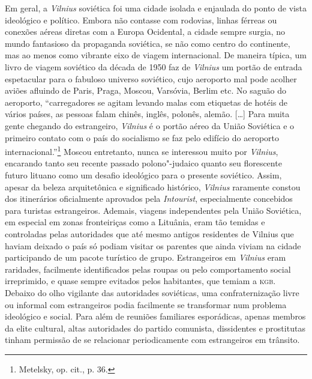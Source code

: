 Em geral, a \textit{Vilnius} soviética foi uma cidade isolada e enjaulada do
ponto de vista ideológico e político. Embora não contasse com rodovias,
linhas férreas ou conexões aéreas diretas com a Europa Ocidental, a
cidade sempre surgia, no mundo fantasioso da propaganda soviética, se
não como centro do continente, mas ao menos como vibrante eixo de viagem
internacional. De maneira típica, um livro de viagem soviético da década
de 1950 faz de \textit{Vilnius} um portão de entrada espetacular para o fabuloso
universo soviético, cujo aeroporto mal pode acolher aviões afluindo de
Paris, Praga, Moscou, Varsóvia, Berlim etc. No saguão do aeroporto,
``carregadores se agitam levando malas com etiquetas de hotéis de vários
países, as pessoas falam chinês, inglês, polonês, alemão. [\ldots{}] Para
muita gente chegando do estrangeiro, \textit{Vilnius} é o portão aéreo da União
Soviética e o primeiro contato com o país do socialismo se faz pelo
edifício do aeroporto internacional.''\footnote{Metelsky, op. cit., p. 36.} Moscou entretanto, nunca se interessou muito por \textit{Vilnius}, encarando tanto seu recente passado polono"-judaico quanto seu
florescente futuro lituano como um desafio ideológico para o presente
soviético. Assim, apesar da beleza arquitetônica e significado
histórico, \textit{Vilnius} raramente constou dos itinerários oficialmente
aprovados pela \textit{Intourist}, especialmente concebidos para turistas
estrangeiros. Ademais, viagens independentes pela União Soviética, em
especial em zonas fronteiriças como a Lituânia, eram tão temidas e
controladas pelas autoridades que até mesmo antigos residentes de
Vilnius que haviam deixado o país só podiam visitar os parentes que
ainda viviam na cidade participando de um pacote turístico de grupo.
Estrangeiros em \textit{Vilnius} eram raridades, facilmente identificados pelas
roupas ou pelo comportamento social irreprimido, e quase sempre evitados
pelos habitantes, que temiam a \textsc{kgb}. Debaixo do olho vigilante das
autoridades soviéticas, uma confraternização livre ou informal com
estrangeiros podia facilmente se transformar num problema ideológico e
social. Para além de reuniões familiares esporádicas, apenas membros da
elite cultural, altas autoridades do partido comunista, dissidentes e
prostitutas tinham permissão de se relacionar periodicamente com
estrangeiros em trânsito.

